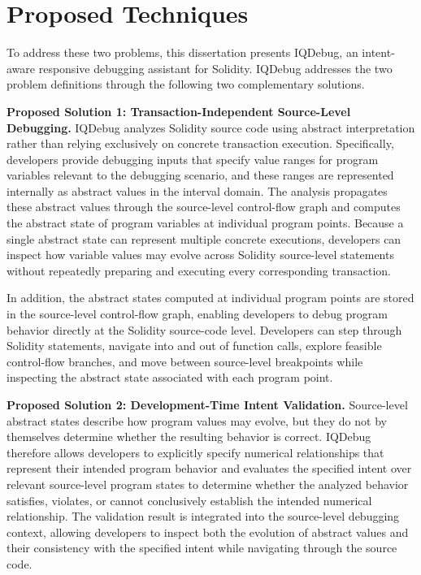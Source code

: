 \documentclass[11pt,oneside]{report}
\theoremstyle{plain}
\theoremstyle{definition}
\theoremstyle{remark}
\begin{document}
\section{Proposed Techniques}\label{sec:intro:techniques}
To address these two problems, this dissertation presents IQDebug, an intent-aware responsive debugging assistant for Solidity.
IQDebug addresses the two problem definitions through the following two complementary solutions.

\smallskip
\noindent\textbf{Proposed Solution 1: Transaction-Independent Source-Level Debugging.}
IQDebug analyzes Solidity source code using abstract interpretation rather than relying exclusively on concrete transaction execution.
Specifically, developers provide debugging inputs that specify value ranges for program variables relevant to the debugging scenario, and these ranges are represented internally as abstract values in the interval domain.
The analysis propagates these abstract values through the source-level control-flow graph and computes the abstract state of program variables at individual program points.
Because a single abstract state can represent multiple concrete executions, developers can inspect how variable values may evolve across Solidity source-level statements without repeatedly preparing and executing every corresponding transaction.

In addition, the abstract states computed at individual program points are stored in the source-level control-flow graph, enabling developers to debug program behavior directly at the Solidity source-code level.
Developers can step through Solidity statements, navigate into and out of function calls, explore feasible control-flow branches, and move between source-level breakpoints while inspecting the abstract state associated with each program point.

\smallskip
\noindent\textbf{Proposed Solution 2: Development-Time Intent Validation.}
Source-level abstract states describe how program values may evolve, but they do not by themselves determine whether the resulting behavior is correct.
IQDebug therefore allows developers to explicitly specify numerical relationships that represent their intended program behavior and evaluates the specified intent over relevant source-level program states to determine whether the analyzed behavior satisfies, violates, or cannot conclusively establish the intended numerical relationship.
The validation result is integrated into the source-level debugging context, allowing developers to inspect both the evolution of abstract values and their consistency with the specified intent while navigating through the source code.
\end{document}
